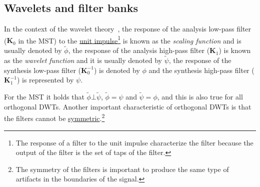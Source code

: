 \subsection{Wavelets and filter banks}
In the context of the wavelet theory~\cite{burrus2013wavelets}, the
response of the analysis low-pass filter (${\mathbf K}_0$ in the MST)
to the
\href{https://en.wikipedia.org/?title=Unit_impulse&redirect=no}{unit
  impulse}\footnote{The response of a filter to the unit impulse
characterize the filter because the output of the filter is the set of
taps of the filter.} is known as the \emph{scaling function} and is
usually denoted by $\tilde\phi$, the response of the analysis
high-pass filter (${\mathbf K}_1$) is known as the \emph{wavelet
function} and it is usually denoted by $\tilde\psi$, the response of
the synthesis low-pass filter (${\mathbf K}^{-1}_0$) is denoted by
$\phi$ and the synthesis high-pass filter (${\mathbf K}^{-1}_1$) is
represented by $\psi$.

For the MST it holds that $\tilde\phi\bot\tilde\psi$,
$\tilde\phi=\psi$ and $\tilde\psi=\phi$, and this is also true for all
orthogonal DWTs. Another important characteristic of orthogonal DWTs
is that the filters cannot be
\href{https://en.wikipedia.org/wiki/Symmetry}{symmetric}.\footnote{The
symmetry of the filters is important to produce the same type of
artifacts in the boundaries of the signal.}


